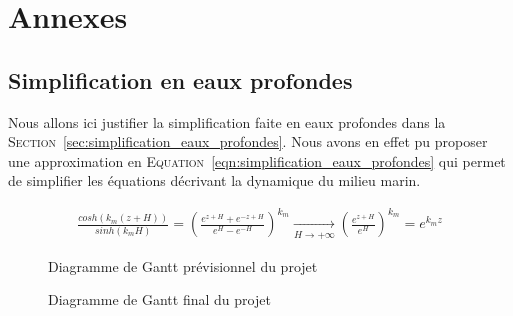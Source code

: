 \chapter{Annexes}
\label{annexe:gantt}

	\section{Simplification en eaux profondes}

		Nous allons ici justifier la simplification faite en eaux profondes dans la \textsc{Section}~\ref{sec:simplification_eaux_profondes}. Nous avons en effet pu proposer une approximation en \textsc{Equation}~\ref{eqn:simplification_eaux_profondes} qui permet de simplifier les équations décrivant la dynamique du milieu marin.

		\begin{eqnarray}
			\frac{cosh(k_m(z+H))}{sinh(k_mH)} = \left( \frac{e^{z+H} + e^{-z+H}}{e^{H}-e^{-H}} \right)^{k_m}  \xrightarrow[H \rightarrow + \infty]{}   \left( \frac{e^{z+H}}{e^{H}} \right)^{k_m} = e^{k_m z}
		\end{eqnarray}

	\clearpage

	\begin{figure}[H]
		\centering
        \label{fig:gantt_before}
        \caption{Diagramme de Gantt prévisionnel du projet}
	\end{figure}

	\begin{figure}[H]
		\centering
        \label{fig:gantt_after}
        \caption{Diagramme de Gantt final du projet}
	\end{figure}